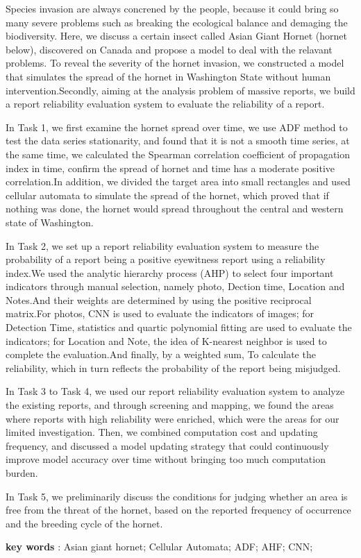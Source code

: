 \documentclass[13pt]{ctexart}
\begin{document}
\begin{adjustwidth}{1cm}{1cm}
\indent { }{ }{ }{ }{ }{ }Species invasion are always concrened by the people, because it could bring so many severe problems such as breaking the ecological balance and demaging the biodiversity. Here, we discuss a certain insect called Asian Giant Hornet (hornet below), discovered on Canada and propose a model to deal with the relavant problems.
To reveal the severity of the hornet invasion, we constructed a model that simulates the spread of the hornet in Washington State without human intervention.Secondly, aiming at the analysis problem of massive reports, we build a report reliability evaluation system to evaluate the reliability of a report.

In Task 1, we first examine the hornet spread over time, we use ADF method to test the data series stationarity, and found that it is not a smooth time series, at the same time, we calculated the Spearman correlation coefficient of propagation index in time, confirm the spread of hornet and time has a moderate positive correlation.In addition, we divided the target area into small rectangles and used cellular automata to simulate the spread of the hornet, which proved that if nothing was done, the hornet would spread throughout the central and western state of Washington.

In Task 2, we set up a report reliability evaluation system to measure the probability of a report being a positive eyewitness report using a reliability index.We used the analytic hierarchy process (AHP) to select four important indicators through manual selection, namely photo, Dection time, Location and Notes.And their weights are determined by using the positive reciprocal matrix.For photos, CNN is used to evaluate the indicators of images; for Detection Time, statistics and quartic polynomial fitting are used to evaluate the indicators; for Location and Note, the idea of K-nearest neighbor is used to complete the evaluation.And finally, by a weighted sum,
To calculate the reliability, which in turn reflects the probability of the report being misjudged.

In Task 3 to Task 4, we used our report reliability evaluation system to analyze the existing reports, and through screening and mapping, we found the areas where reports with high reliability were enriched, which were the areas for our limited investigation.
Then, we combined computation cost and updating frequency, and discussed a model updating strategy that could continuously improve model accuracy over time without bringing too much computation burden.

In Task 5, we preliminarily discuss the conditions for judging whether an area is free from the threat of the hornet, based on the reported frequency of occurrence and the breeding cycle of the hornet.

\vspace{10pt}
\textbf{key words} : Asian giant hornet; Cellular Automata; ADF; AHF; CNN;
\end{adjustwidth} 
\end{document}
